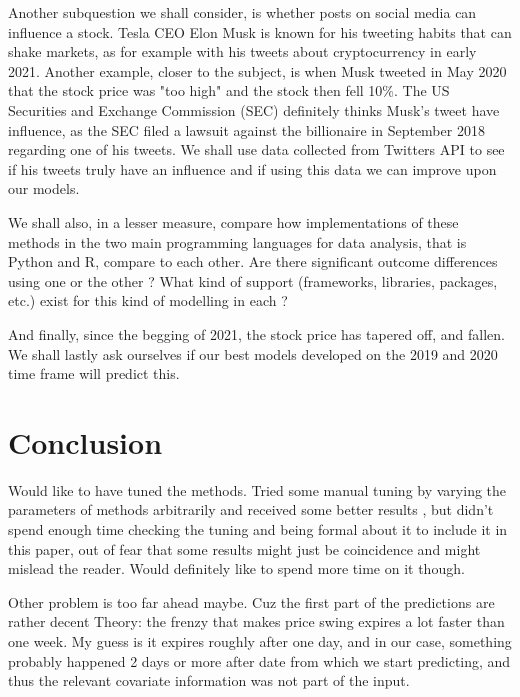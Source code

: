 \documentclass[10pt]{report}
\begin{document}
Another subquestion we shall consider, is whether posts on social media can influence a stock.
Tesla CEO Elon Musk is known for his tweeting habits that can shake markets, as for example with his tweets about cryptocurrency in early 2021. Another example, closer to the subject, is when Musk tweeted in May 2020 that the stock price was "too high" and the stock then fell 10$\%$. The US Securities and Exchange Commission (SEC) definitely thinks Musk's tweet have influence, as the SEC filed a lawsuit against the billionaire in September 2018 regarding one of his tweets. We shall use data collected from Twitters API to see if his tweets truly have an influence and if using this data we can improve upon our models.


We shall also, in a lesser measure, compare how implementations of these methods in the two main programming languages for data analysis, that is Python and R, compare to each other. Are there significant outcome differences using one or the other ? What kind of support (frameworks, libraries, packages, etc.) exist for this kind of modelling in each ?

And finally, since the begging of 2021, the stock price has tapered off, and fallen. We shall lastly ask ourselves if our best models developed on the 2019 and 2020 time frame will predict this.











\chapter{Conclusion}

Would like to have tuned the methods. Tried some manual tuning by varying the parameters of methods arbitrarily  and received some better results , but didn't spend enough time checking the tuning and being formal about it to include it in this paper, out of fear that some results might just be coincidence and might mislead the reader. Would definitely like to spend more time on it though.

Other problem is too far ahead maybe. Cuz the first part of the predictions are rather decent
Theory: the frenzy that makes price swing expires a lot faster than one week. My guess is it expires roughly after one day, and in our case, something probably happened 2 days or more after date from which we start predicting, and thus the relevant covariate information was not part of the input.
\end{document}
